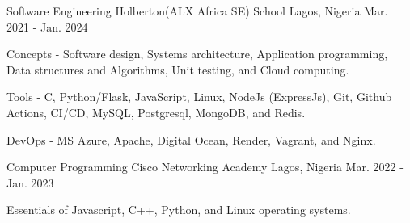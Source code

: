 

\begin{cventries}

  \cventry
    {Software Engineering} %
    {Holberton(ALX Africa SE) School} %
    {Lagos, Nigeria} %
    {Mar. 2021 - Jan. 2024} %
    {
      \begin{cvitems} %
        \item {Concepts - Software design, Systems architecture, Application programming, Data structures and Algorithms, Unit testing, and Cloud computing.}
        \item {Tools - C, Python/Flask, JavaScript, Linux, NodeJs (ExpressJs), Git, Github Actions, CI/CD, MySQL, Postgresql, MongoDB, and Redis.}
        \item {DevOps - MS Azure, Apache, Digital Ocean, Render, Vagrant, and Nginx.}
      \end{cvitems}
    }

  \cventry
    {Computer Programming} %
    {Cisco Networking Academy} %
    {Lagos, Nigeria} %
    {Mar. 2022 - Jan. 2023} %
    {
      \begin{cvitems} %
        \item {Essentials of Javascript, C++, Python, and Linux operating systems.}
      \end{cvitems}
    }

\end{cventries}
